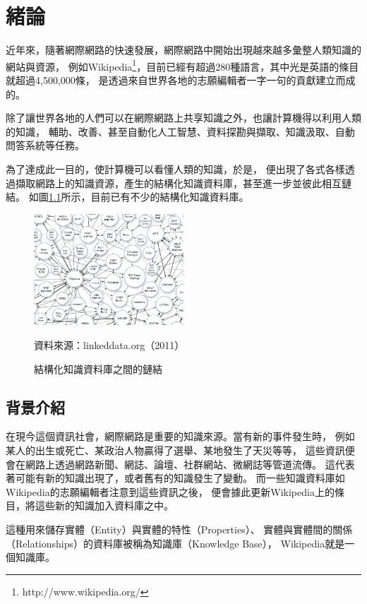 %
%
%
\chapter{緒論}
\label{c:intro}

近年來，隨著網際網路的快速發展，網際網路中開始出現越來越多彙整人類知識的網站與資源，
例如Wikipedia\footnote{http://www.wikipedia.org/}，目前已經有超過280種語言，其中光是英語的條目就超過4,500,000條，
是透過來自世界各地的志願編輯者一字一句的貢獻建立而成的。

除了讓世界各地的人們可以在網際網路上共享知識之外，也讓計算機得以利用人類的知識，
輔助、改善、甚至自動化人工智慧、資料探勘與擷取、知識汲取、自動問答系統等任務。

為了達成此一目的，使計算機可以看懂人類的知識，於是，
便出現了各式各樣透過擷取網路上的知識資源，產生的結構化知識資料庫，甚至進一步並彼此相互鏈結。
如圖\ref{i:lod}所示，目前已有不少的結構化知識資料庫。

\begin{figure}
\centering
\includegraphics[width=0.5\textwidth]{images/01-lod-datasets}
\caption{結構化知識資料庫之間的鏈結}
\label{i:lod}
資料來源：linkeddata.org（2011）
\end{figure}

%
%
\section{背景介紹}
在現今這個資訊社會，網際網路是重要的知識來源。當有新的事件發生時，
例如某人的出生或死亡、某政治人物贏得了選舉、某地發生了天災等等，
這些資訊便會在網路上透過網路新聞、網誌、論壇、社群網站、微網誌等管道流傳。
這代表著可能有新的知識出現了，或者舊有的知識發生了變動。
而一些知識資料庫如Wikipedia的志願編輯者注意到這些資訊之後，
便會據此更新Wikipedia上的條目，將這些新的知識加入資料庫之中。

這種用來儲存實體（Entity）與實體的特性（Properties）、
實體與實體間的關係（Relationships）的資料庫被稱為知識庫（Knowledge Base），
Wikipedia就是一個知識庫。

